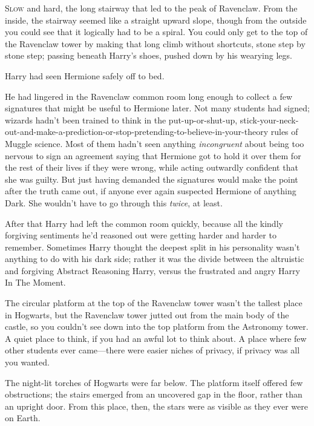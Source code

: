 
\lettrine{S}{low} and hard, the long stairway that led to the peak of Ravenclaw. From the inside, the stairway seemed like a straight upward slope, though from the outside you could see that it logically had to be a spiral. You could only get to the top of the Ravenclaw tower by making that long climb without shortcuts, stone step by stone step; passing beneath Harry's shoes, pushed down by his wearying legs.

Harry had seen Hermione safely off to bed.

He had lingered in the Ravenclaw common room long enough to collect a few signatures that might be useful to Hermione later. Not many students had signed; wizards hadn't been trained to think in the put-up-or-shut-up, stick-your-neck-out-and-make-a-prediction-or-stop-pretending-to-believe-in-your-theory rules of Muggle science. Most of them hadn't seen anything \emph{incongruent} about being too nervous to sign an agreement saying that Hermione got to hold it over them for the rest of their lives if they were wrong, while acting outwardly confident that she was guilty. But just having demanded the signatures would make the point after the truth came out, if anyone ever again suspected Hermione of anything Dark. She wouldn't have to go through this \emph{twice}, at least.

After that Harry had left the common room quickly, because all the kindly forgiving sentiments he'd reasoned out were getting harder and harder to remember. Sometimes Harry thought the deepest split in his personality wasn't anything to do with his dark side; rather it was the divide between the altruistic and forgiving Abstract Reasoning Harry, versus the frustrated and angry Harry In The Moment.

The circular platform at the top of the Ravenclaw tower wasn't the tallest place in Hogwarts, but the Ravenclaw tower jutted out from the main body of the castle, so you couldn't see down into the top platform from the Astronomy tower. A quiet place to think, if you had an awful lot to think about. A place where few other students ever came---there were easier niches of privacy, if privacy was all you wanted.

The night-lit torches of Hogwarts were far below. The platform itself offered few obstructions; the stairs emerged from an uncovered gap in the floor, rather than an upright door. From this place, then, the stars were as visible as they ever were on Earth.

